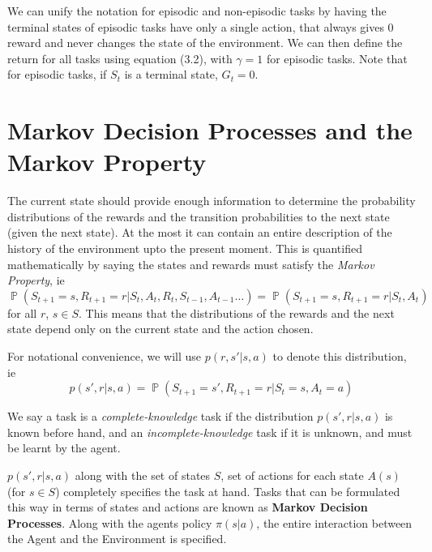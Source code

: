 \documentclass[12pt]{report}
\begin{document}
We can unify the notation for episodic and non-episodic tasks by having the terminal states of episodic tasks have only a single action, that always gives $0$ reward and never changes the state of the environment.
We can then define the return for all tasks using equation (3.2), with $\gamma = 1$ for episodic tasks. Note that for episodic tasks, if $S_{t}$ is a terminal state, $G_{t} = 0$.

\section{Markov Decision Processes and the Markov Property}
The current state should provide enough information to determine the probability distributions of the rewards and the transition probabilities to the next state (given the next state). At the most it can contain an entire description of the history of the environment 
upto the present moment. This is quantified mathematically by saying the states and rewards must satisfy the \textit{Markov Property}, ie 
\begin{equation}
    \mathop{\mathbb{P}}(S_{t + 1} = s, R_{t + 1} = r | S_{t}, A_{t}, R_{t}, S_{t - 1}, A_{t - 1} \dots) = \mathop{\mathbb{P}}(S_{t + 1} = s, R_{t + 1} = r | S_{t}, A_{t})
\end{equation}
for all $r$, $s \in S$. This means that the distributions of the rewards and the next state depend only on the current state and the action chosen.

For notational convenience, we will use $p(r, s' | s, a)$ to denote this distribution, ie 
\begin{equation}
    p(s', r | s, a) = \mathop{\mathbb{P}}(S_{t + 1} = s', R_{t + 1} = r | S_{t} = s, A_{t} = a)
\end{equation}

We say a task is a \textit{complete-knowledge} task if the distribution $p(s', r | s, a)$ is known before hand, and an \textit{incomplete-knowledge} task if it is unknown, and must be learnt by the agent.

$p(s', r | s, a)$ along with the set of states $S$, set of actions for each state $A(s)$ (for $s \in S$) completely specifies the task at hand. Tasks that can be formulated this way in terms of 
states and actions are known as \textbf{Markov Decision Processes}. Along with the agents policy $\pi(s | a)$, the entire interaction between the Agent and the Environment is specified.
\end{document}
